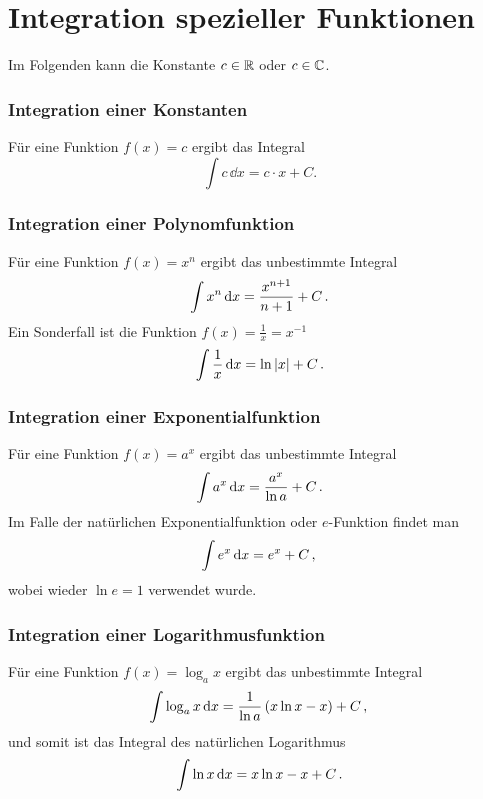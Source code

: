 \section{Integration spezieller Funktionen}\label{sec: Integration_spezFunktionen}
Im Folgenden kann die Konstante $c \in \mathbb{R}$ oder $c \in \mathbb{C}$.
\subsubsection{Integration einer Konstanten}
Für eine Funktion $f(x) = c$ ergibt das Integral
\begin{equation}
    \int c\,\dd x = c\cdot x + C.
\end{equation}

\subsubsection{Integration einer Polynomfunktion}
Für eine Funktion $f(x) = x^n$ ergibt das unbestimmte Integral
\begin{equation}
    \int x^{n} \,\mathrm{d} x = \frac{x^{n+1}}{n+1} + C \,.
\end{equation}
Ein Sonderfall ist die Funktion $f(x) = \frac{1}{x} = x^{-1}$
\begin{equation}
    \int \frac{1}{x} \,\mathrm{d} x = \ln{|x|} + C \,.
\end{equation}

\subsubsection{Integration einer Exponentialfunktion}
Für eine Funktion $f(x) = a^x$ ergibt das unbestimmte Integral
\begin{equation}
    \int a^{x}\,\mathrm{d} x = \frac{a^{x}}{\ln{a}} + C \,.
\end{equation}
Im Falle der natürlichen Exponentialfunktion oder $e$-Funktion findet man
\begin{equation}
    \int e^{x}\,\mathrm{d} x = e^{x} + C\,{,}\,
\end{equation}
wobei wieder $\ln{e} = 1$ verwendet wurde.

\subsubsection{Integration einer Logarithmusfunktion}
Für eine Funktion $f(x) = \log_a{x}$ ergibt das unbestimmte Integral
\begin{equation}
    \int \log_a{x}\,\mathrm{d} x = \frac{1}{\ln{a}}\left(x\ln{x} - x\right) + C\,{,}\,
\end{equation}
und somit ist das Integral des natürlichen Logarithmus
\begin{equation}
    \int \ln{x}\,\mathrm{d} x = x\ln{x} - x + C\,.
\end{equation}

